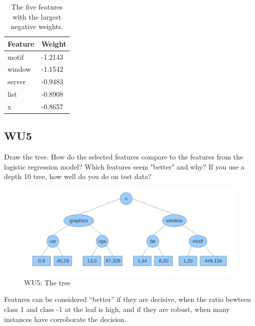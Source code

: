 \documentclass[a4paper,11pt]{article}
\begin{document}
\begin{table}[!ht]
\begin{center}
    \begin{tabular}{| l | l |}
    \hline
    Feature &  Weight \\ \hline
    motif   & -1.2143 \\ \hline %
    window  & -1.1542 \\ \hline %
    server  & -0.9483 \\ \hline %
    list    & -0.8908 \\ \hline %
    x       & -0.8657 \\ \hline %
    \end{tabular}
    \caption{The five features with the largest negative weights.}
    \label{tables:WU4Neg}
\end{center}
\end{table}

\newpage

\subsection{WU5}
\textsf{Draw the tree. How do the selected features compare to the
  features from the logistic regression model? Which features seem
  "better" and why? If you use a depth 10 tree, how well do you do on
  test data?}\\

\begin{figure}[!ht]
  \begin{center}
  \includegraphics[width=4.75in]{wu5_tree.pdf}
  \caption{WU5: The tree}
  \end{center}
\end{figure}

Features can be considered ``better'' if they are decisive, 
when the ratio bewteen class 1 and class -1 at the leaf is high, 
and if they are robust, when many instances have corroborate the decision.
\end{document}
